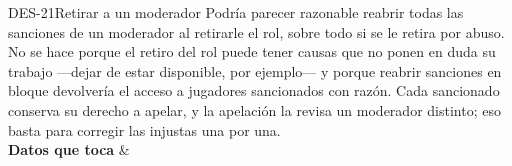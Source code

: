 \begin{fichacu}{DES-21}{Retirar a un moderador}
{    Podría parecer razonable reabrir todas las sanciones de un moderador al retirarle el rol, sobre todo si se le retira por abuso. No se hace porque el retiro del rol puede tener causas que no ponen en duda su trabajo —dejar de estar disponible, por ejemplo— y porque reabrir sanciones en bloque devolvería el acceso a jugadores sancionados con razón. Cada sancionado conserva su derecho a apelar, y la apelación la revisa un moderador distinto; eso basta para corregir las injustas una por una.} \\ \hline
  \textbf{Datos que toca} &  \\ \hline
\end{fichacu}
\clearpage
